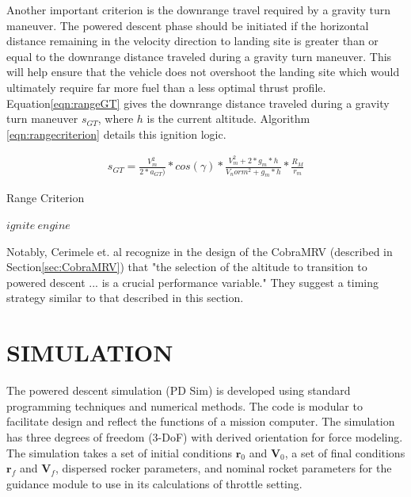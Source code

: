 Another important criterion is the downrange travel required by a gravity turn maneuver. The powered descent phase should be initiated if the horizontal distance remaining in the velocity direction to landing site is greater than or equal to the downrange distance traveled during a gravity turn maneuver. This will help ensure that the vehicle does not overshoot the landing site which would ultimately require far more fuel than a less optimal thrust profile. Equation\ref{eqn:rangeGT} gives the downrange distance traveled during a gravity turn maneuver $s_{GT}$, where $h$ is the current altitude. Algorithm \ref{eqn:rangecriterion} details this ignition logic.

\begin{equation}
\label{eqn:rangeGT}
\begin{split}
s_{GT} = \frac{V_m^2}{2*a_{GT})}*cos(\gamma)*\frac{V_m^2+2*g_m*h}{V_norm^2+g_m*h}*\frac{R_M}{r_m}
\end{split}
\end{equation}

\begin{algorithm}
	\caption{Range Criterion}\label{eqn:rangecriterion}
	\begin{algorithmic}[1]
			\State $ ignite\: engine $
		\EndIf
	\end{algorithmic}
\end{algorithm}

Notably, Cerimele et. al\:\cite{CERIMELE} recognize in the design of the CobraMRV (described in Section\:\ref{sec:CobraMRV}) that "the selection of the altitude to transition to powered descent ... is a crucial performance variable." They suggest a timing strategy similar to that described in this section.

\chapter{SIMULATION} \label{chap:simulation}

The powered descent simulation (PD Sim) is developed using standard programming techniques and numerical methods. The code is modular to facilitate design and reflect the functions of a mission computer. The simulation has three degrees of freedom (3-DoF) with derived orientation for force modeling. The simulation takes a set of initial conditions $\bm{r}_0$ and $\bm{V}_0$, a set of final conditions $\bm{r}_f$ and $\bm{V}_f$, dispersed rocker parameters, and nominal rocket parameters for the guidance module to use in its calculations of throttle setting.

